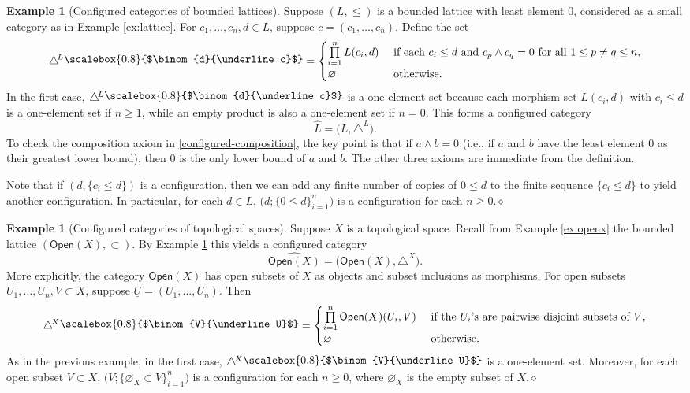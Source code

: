 \documentclass{amsbook}
\numberwithin{section}{chapter}
\numberwithin{subsection}{section}
\numberwithin{equation}{section}
\theoremstyle{plain}
\theoremstyle{definition}
\newtheorem{example}[equation]{Example}
\newcommand{\dqed}{\hfill$\diamond$}
\newcommand{\Config}{\triangle} %
\newcommand{\Configl}{\Config^{\! L}}
\newcommand{\Configx}{\Config^{\! X}}
\newcommand{\Lhat}{\widehat{L}}
\renewcommand{\emptyset}{\varnothing}
\newcommand{\Open}{\mathsf{Open}}
\newcommand{\Openx}{\Open(X)}
\newcommand{\Openxhat}{\widehat{\Openx}}
\newcommand{\uc}{\underline c}
\newcommand{\uU}{\underline U}
\newcommand{\smallprof}[1]
{\raisebox{.05cm}{\scalebox{0.8}{#1}}}
\newcommand{\duc}{\smallprof{$\binom{d}{\uc}$}}
\newcommand{\VuU}{\smallprof{$\binom{V}{\uU}$}}
\begin{document}
\begin{example}[Configured categories of bounded lattices]\label{ex:boundedlatter-config}
Suppose $(L,\leq)$ is a bounded lattice with least element $0$, considered as a small category as in Example \ref{ex:lattice}.  For $c_1,\ldots,c_n,d \in L$, suppose $\uc=(c_1,\ldots,c_n)$.  Define the set
\[\Configl\duc= \begin{cases} \prod\limits_{i=1}^n L(c_i,d) & \text{ if each $c_i \leq d$ and $c_p \wedge c_q=0$ for all $1 \leq p\not=q \leq n$},\\ \varnothing & \text{ otherwise}.\end{cases}\]
In the first case, $\Configl\duc$ is a one-element set because each morphism set $L(c_i,d)$ with $c_i \leq d$ is a one-element set if $n \geq 1$, while an empty product is also a one-element set if $n=0$. This forms a configured category\label{notation:lhat} \[\Lhat =\bigl(L,\Configl\bigr).\]  To check the composition axiom in \eqref{configured-composition}, the key point is that if $a \wedge b = 0$ (i.e., if $a$ and $b$ have the least element $0$ as their greatest lower bound), then $0$ is the only lower bound of $a$ and $b$.  The other three axioms are immediate from the definition.  

Note that if $(d,\{c_i \leq d\})$ is a configuration, then we can add any finite number of copies of $0 \leq d$ to the finite sequence $\{c_i \leq d\}$ to yield another configuration.  In particular, for each $d \in L$, $\bigl(d;\{0\leq d\}_{i=1}^n\bigr)$ is a configuration for each $n \geq 0$.\dqed
\end{example}

\begin{example}[Configured categories of topological spaces]\label{ex:open-configuration}
Suppose $X$ is a topological space.  Recall from Example \ref{ex:openx} the bounded lattice $(\Openx,\subset)$.  By Example \ref{ex:boundedlatter-config} this yields a configured category \[\Openxhat =\bigl(\Openx,\Configx\bigr).\] More explicitly, the category $\Openx$ has open subsets of $X$ as objects and subset inclusions as morphisms.  For open subsets $U_1,\ldots,U_n,V \subset X$, suppose $\uU = (U_1,\ldots,U_n)$. Then \[\Configx\VuU = \begin{cases} \prod\limits_{i=1}^n\Openx(U_i,V) & \text{ if the $U_i$'s are pairwise disjoint subsets of $V$},\\ \varnothing & \text{ otherwise}.\end{cases}\]
As in the previous example, in the first case, $\Configx\VuU$ is a one-element set.  Moreover, for each open subset $V \subset X$, $\bigl(V;\{\emptyset_X \subset V\}_{i=1}^n\bigr)$ is a configuration for each $n \geq 0$, where $\emptyset_X$ is the empty subset of $X$.\dqed
\end{example}
\end{document}
